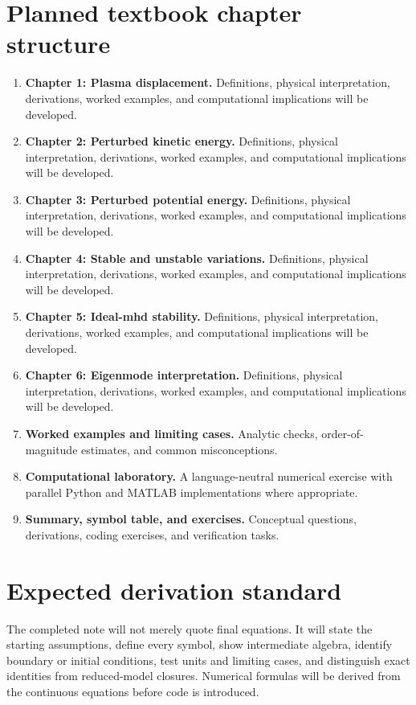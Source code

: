 \documentclass[11pt]{article}
\begin{document}
\section{Planned textbook chapter structure}
\begin{enumerate}[leftmargin=1.8em]
\item \textbf{Chapter 1: Plasma displacement.} Definitions, physical interpretation, derivations, worked examples, and computational implications will be developed.
\item \textbf{Chapter 2: Perturbed kinetic energy.} Definitions, physical interpretation, derivations, worked examples, and computational implications will be developed.
\item \textbf{Chapter 3: Perturbed potential energy.} Definitions, physical interpretation, derivations, worked examples, and computational implications will be developed.
\item \textbf{Chapter 4: Stable and unstable variations.} Definitions, physical interpretation, derivations, worked examples, and computational implications will be developed.
\item \textbf{Chapter 5: Ideal-mhd stability.} Definitions, physical interpretation, derivations, worked examples, and computational implications will be developed.
\item \textbf{Chapter 6: Eigenmode interpretation.} Definitions, physical interpretation, derivations, worked examples, and computational implications will be developed.
\item \textbf{Worked examples and limiting cases.} Analytic checks, order-of-magnitude estimates, and common misconceptions.
\item \textbf{Computational laboratory.} A language-neutral numerical exercise with parallel Python and MATLAB implementations where appropriate.
\item \textbf{Summary, symbol table, and exercises.} Conceptual questions, derivations, coding exercises, and verification tasks.
\end{enumerate}

\section{Expected derivation standard}
The completed note will not merely quote final equations. It will state the starting assumptions, define every symbol, show intermediate algebra, identify boundary or initial conditions, test units and limiting cases, and distinguish exact identities from reduced-model closures. Numerical formulas will be derived from the continuous equations before code is introduced.
\end{document}
